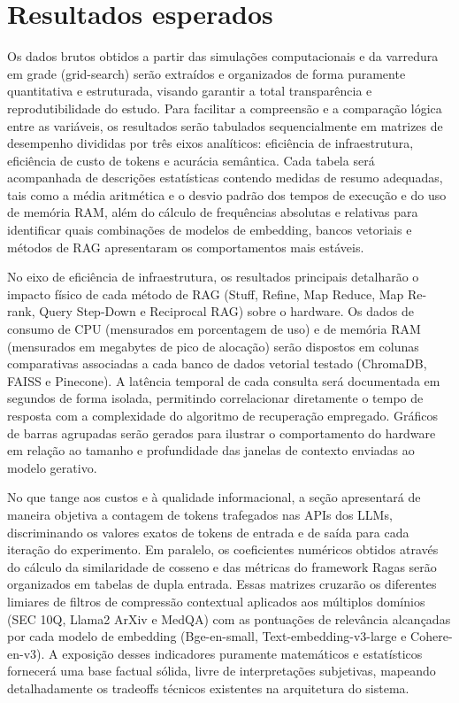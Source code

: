 \newpage
\section{Resultados esperados}
\label{sc:resultados}

Os dados brutos obtidos a partir das simulações computacionais e da varredura em grade (grid-search) serão extraídos e organizados de forma puramente quantitativa e estruturada, visando garantir a total transparência e reprodutibilidade do estudo. Para facilitar a compreensão e a comparação lógica entre as variáveis, os resultados serão tabulados sequencialmente em matrizes de desempenho divididas por três eixos analíticos: eficiência de infraestrutura, eficiência de custo de tokens e acurácia semântica. Cada tabela será acompanhada de descrições estatísticas contendo medidas de resumo adequadas, tais como a média aritmética e o desvio padrão dos tempos de execução e do uso de memória RAM, além do cálculo de frequências absolutas e relativas para identificar quais combinações de modelos de embedding, bancos vetoriais e métodos de RAG apresentaram os comportamentos mais estáveis.

No eixo de eficiência de infraestrutura, os resultados principais detalharão o impacto físico de cada método de RAG (Stuff, Refine, Map Reduce, Map Re-rank, Query Step-Down e Reciprocal RAG) sobre o hardware. Os dados de consumo de CPU (mensurados em porcentagem de uso) e de memória RAM (mensurados em megabytes de pico de alocação) serão dispostos em colunas comparativas associadas a cada banco de dados vetorial testado (ChromaDB, FAISS e Pinecone). A latência temporal de cada consulta será documentada em segundos de forma isolada, permitindo correlacionar diretamente o tempo de resposta com a complexidade do algoritmo de recuperação empregado. Gráficos de barras agrupadas serão gerados para ilustrar o comportamento do hardware em relação ao tamanho e profundidade das janelas de contexto enviadas ao modelo gerativo.

No que tange aos custos e à qualidade informacional, a seção apresentará de maneira objetiva a contagem de tokens trafegados nas APIs dos LLMs, discriminando os valores exatos de tokens de entrada e de saída para cada iteração do experimento. Em paralelo, os coeficientes numéricos obtidos através do cálculo da similaridade de cosseno e das métricas do framework Ragas serão organizados em tabelas de dupla entrada. Essas matrizes cruzarão os diferentes limiares de filtros de compressão contextual aplicados aos múltiplos domínios (SEC 10Q, Llama2 ArXiv e MedQA) com as pontuações de relevância alcançadas por cada modelo de embedding (Bge-en-small, Text-embedding-v3-large e Cohere-en-v3). A exposição desses indicadores puramente matemáticos e estatísticos fornecerá uma base factual sólida, livre de interpretações subjetivas, mapeando detalhadamente os tradeoffs técnicos existentes na arquitetura do sistema.